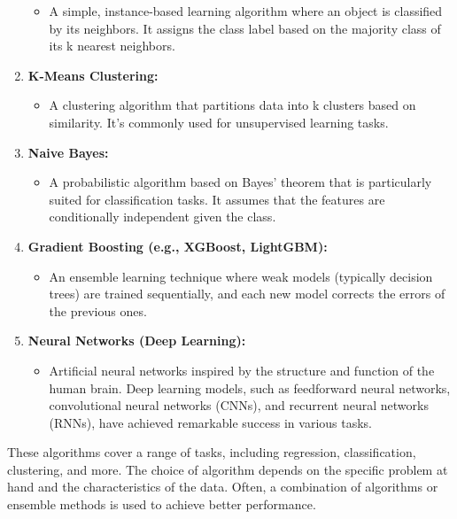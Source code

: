 \documentclass[
]{book}
\providecommand{\tightlist}{%
  \setlength{\itemsep}{0pt}\setlength{\parskip}{0pt}}
\begin{document}
\begin{enumerate}
  \begin{itemize}
  \tightlist
  \item
    A simple, instance-based learning algorithm where an object is classified by its neighbors. It assigns the class label based on the majority class of its k nearest neighbors.
  \end{itemize}
\item
  \textbf{K-Means Clustering:}

  \begin{itemize}
  \tightlist
  \item
    A clustering algorithm that partitions data into k clusters based on similarity. It's commonly used for unsupervised learning tasks.
  \end{itemize}
\item
  \textbf{Naive Bayes:}

  \begin{itemize}
  \tightlist
  \item
    A probabilistic algorithm based on Bayes' theorem that is particularly suited for classification tasks. It assumes that the features are conditionally independent given the class.
  \end{itemize}
\item
  \textbf{Gradient Boosting (e.g., XGBoost, LightGBM):}

  \begin{itemize}
  \tightlist
  \item
    An ensemble learning technique where weak models (typically decision trees) are trained sequentially, and each new model corrects the errors of the previous ones.
  \end{itemize}
\item
  \textbf{Neural Networks (Deep Learning):}

  \begin{itemize}
  \tightlist
  \item
    Artificial neural networks inspired by the structure and function of the human brain. Deep learning models, such as feedforward neural networks, convolutional neural networks (CNNs), and recurrent neural networks (RNNs), have achieved remarkable success in various tasks.
  \end{itemize}
\end{enumerate}

These algorithms cover a range of tasks, including regression, classification, clustering, and more. The choice of algorithm depends on the specific problem at hand and the characteristics of the data. Often, a combination of algorithms or ensemble methods is used to achieve better performance.
\end{document}

